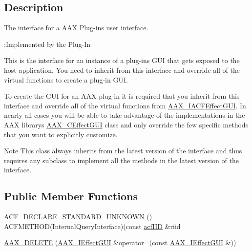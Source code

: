 \subsection{Description}
The interface for a A\+A\+X Plug-\/in\textquotesingle{}s user interface. 

\begin{DoxyRefDesc}{\+:\+Implemented by the Plug-\/\+In}
\item[\hyperlink{a00004__aax_plugin_implementation000002}{\+:\+Implemented by the Plug-\/\+In}]\end{DoxyRefDesc}


This is the interface for an instance of a plug-\/in\textquotesingle{}s G\+U\+I that gets exposed to the host application. You need to inherit from this interface and override all of the virtual functions to create a plug-\/in G\+U\+I.

To create the G\+U\+I for an A\+A\+X plug-\/in it is required that you inherit from this interface and override all of the virtual functions from \hyperlink{a00060}{A\+A\+X\+\_\+\+I\+A\+C\+F\+Effect\+G\+U\+I}. In nearly all cases you will be able to take advantage of the implementations in the A\+A\+X library\textquotesingle{}s \hyperlink{a00017}{A\+A\+X\+\_\+\+C\+Effect\+G\+U\+I} class and only override the few specific methods that you want to explicitly customize.

\begin{DoxyNote}{Note}
This class always inherits from the latest version of the interface and thus requires any subclass to implement all the methods in the latest version of the interface. 
\end{DoxyNote}
\subsection*{Public Member Functions}
\begin{DoxyCompactItemize}
\item 
\hyperlink{a00098_a8b48b2f7798aa1ad2ebb38a93ad409b9}{A\+C\+F\+\_\+\+D\+E\+C\+L\+A\+R\+E\+\_\+\+S\+T\+A\+N\+D\+A\+R\+D\+\_\+\+U\+N\+K\+N\+O\+W\+N} () A\+C\+F\+M\+E\+T\+H\+O\+D(Internal\+Query\+Interface)(const \hyperlink{a00150_a59df0b41744eee7a066787aaedf97f67}{acf\+I\+I\+D} \&riid
\item 
\hyperlink{a00098_abee8b669ca6136a80364127f144d24c3}{A\+A\+X\+\_\+\+D\+E\+L\+E\+T\+E} (\hyperlink{a00098}{A\+A\+X\+\_\+\+I\+Effect\+G\+U\+I} \&operator=(const \hyperlink{a00098}{A\+A\+X\+\_\+\+I\+Effect\+G\+U\+I} \&))
\end{DoxyCompactItemize}
